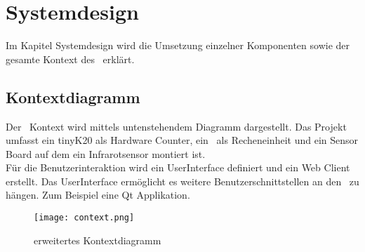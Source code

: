 \section{Systemdesign}
    Im Kapitel Systemdesign wird die Umsetzung einzelner Komponenten sowie der gesamte Kontext des \documenttitle\ erklärt.
        \subsection{Kontextdiagramm}
        Der \documenttitle\ Kontext wird mittels untenstehendem Diagramm dargestellt. Das Projekt umfasst ein tinyK20 als Hardware Counter, ein \rpi\ als Recheneinheit und ein Sensor Board auf dem ein Infrarotsensor montiert ist.\\
        Für die Benutzerinteraktion wird ein UserInterface definiert und ein Web Client erstellt. Das UserInterface ermöglicht es weitere Benutzerschnittstellen an den \documenttitle\ zu hängen. Zum Beispiel eine Qt Applikation.
        \begin{figure}[H]
            \centering
            \texttt{[image: context.png]}
            \caption{erweitertes Kontextdiagramm}
            \label{fig:kontext}
        \end{figure}


        \clearpage
        
        
        \clearpage
		
		
        \clearpage
        
        \clearpage
        
        \clearpage
        
        \clearpage
		